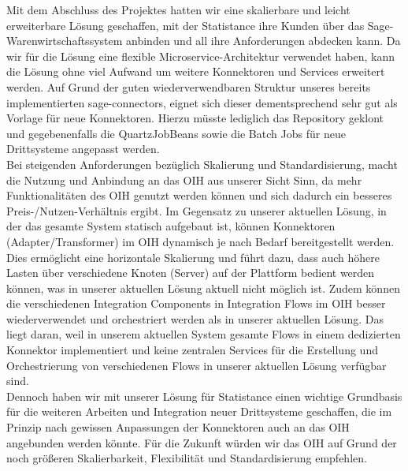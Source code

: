 Mit dem Abschluss des Projektes hatten wir eine skalierbare und leicht erweiterbare Lösung geschaffen, mit der Statistance ihre Kunden über das Sage-Warenwirtschaftssystem anbinden und all ihre Anforderungen abdecken kann. Da wir für die Lösung eine flexible Microservice-Architektur verwendet haben, kann die Lösung ohne viel Aufwand um weitere Konnektoren und Services erweitert werden. Auf Grund der guten wiederverwendbaren Struktur unseres bereits implementierten sage-connectors, eignet sich dieser dementsprechend sehr gut als Vorlage für neue Konnektoren. Hierzu müsste lediglich das Repository geklont und gegebenenfalls die QuartzJobBeans sowie die Batch Jobs für neue Drittsysteme angepasst werden. \\
Bei steigenden Anforderungen bezüglich Skalierung und Standardisierung, macht die Nutzung und Anbindung an das OIH aus unserer Sicht Sinn, da mehr Funktionalitäten des OIH genutzt werden können und sich dadurch ein besseres Preis-/Nutzen-Verhältnis ergibt. Im Gegensatz zu unserer aktuellen Lösung, in der das gesamte System statisch aufgebaut ist, können Konnektoren (Adapter/Transformer) im OIH dynamisch je nach Bedarf bereitgestellt werden. Dies ermöglicht eine horizontale Skalierung und führt dazu, dass auch höhere Lasten über verschiedene Knoten (Server) auf der Plattform bedient werden können, was in unserer aktuellen Lösung aktuell nicht möglich ist. Zudem können die verschiedenen Integration Components in Integration Flows im OIH besser wiederverwendet und orchestriert werden als in unserer aktuellen Lösung. Das liegt daran, weil in unserem aktuellen System gesamte Flows in einem dedizierten Konnektor implementiert und keine zentralen Services für die Erstellung und Orchestrierung von verschiedenen Flows in unserer aktuellen Lösung verfügbar sind. \\
Dennoch haben wir mit unserer Lösung für Statistance einen wichtige Grundbasis für die weiteren Arbeiten und Integration neuer Drittsysteme geschaffen, die im Prinzip nach gewissen Anpassungen der Konnektoren auch an das OIH angebunden werden könnte. Für die Zukunft würden wir das OIH auf Grund der noch größeren Skalierbarkeit, Flexibilität und Standardisierung empfehlen.
